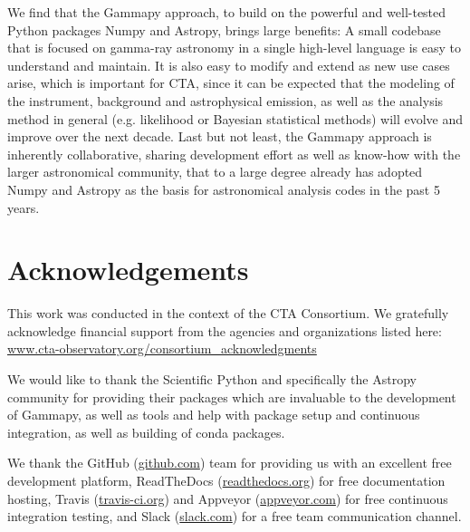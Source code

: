 \documentclass{PoS}
\newcommand{\urlCtaAck}{\href{http://www.cta-observatory.org/consortium_acknowledgments}{www.cta-observatory.org/consortium\_acknowledgments}}
\newcommand{\urlGithub}{\href{https://github.com}{github.com}}
\newcommand{\urlRtd}{\href{https://readthedocs.org}{readthedocs.org}}
\newcommand{\urlTravis}{\href{https://travis-ci.org}{travis-ci.org}}
\newcommand{\urlAppveyor}{\href{https://appveyor.com}{appveyor.com}}
\newcommand{\urlSlack}{\href{https://slack.com}{slack.com}}
\begin{document}
We find that the Gammapy approach, to build on the powerful and well-tested
Python packages Numpy and Astropy, brings large benefits: A small codebase that
is focused on gamma-ray astronomy in a single high-level language is easy to
understand and maintain. It is also easy to modify and extend as new use cases
arise, which is important for CTA, since it can be expected that the modeling of
the instrument, background and astrophysical emission, as well as the analysis
method in general (e.g. likelihood or Bayesian statistical methods) will evolve
and improve over the next decade. Last but not least, the Gammapy approach is
inherently collaborative, sharing development effort as well as know-how with
the larger astronomical community, that to a large degree already has adopted
Numpy and Astropy as the basis for astronomical analysis codes in the past 5
years.

\section{Acknowledgements}
\label{sed:acknowledgements}

This work was conducted in the context of the CTA Consortium. We gratefully
acknowledge financial support from the agencies and organizations listed here:\\
\urlCtaAck

We would like to thank the Scientific Python and specifically the Astropy
community for providing their packages which are invaluable to the development
of Gammapy, as well as tools and help with package setup and continuous
integration, as well as building of conda packages.

We thank the GitHub (\urlGithub) team for providing us with an excellent free
development platform, ReadTheDocs (\urlRtd) for free documentation hosting,
Travis (\urlTravis) and Appveyor (\urlAppveyor) for free continuous integration
testing, and Slack (\urlSlack) for a free team communication channel.



\end{document}
